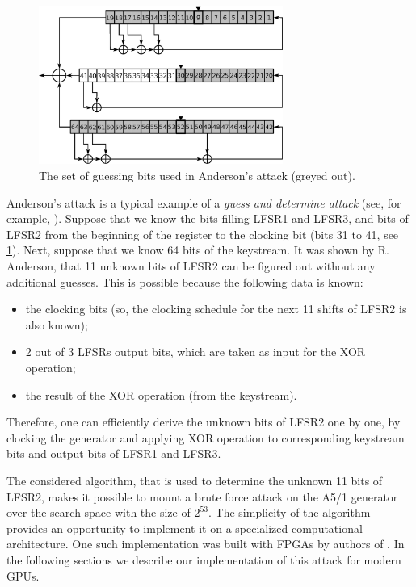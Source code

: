 \documentclass[runningheads,a4paper]{llncs}[2015/06/24]
\begin{document}
\begin{figure}
	\centering
	\includegraphics[width=8cm]{./a51and.eps} 
	\caption{The set of guessing bits used in Anderson's attack (greyed out).}
	\label{fig:a51and}
\end{figure}

Anderson's attack is a typical example of a \textit{guess and determine attack} (see, for example,
\cite{Bard:2009:AC:1618541}). Suppose that we know the bits filling LFSR1 and LFSR3, and
bits of LFSR2 from the beginning of the register to the clocking bit
(bits 31 to 41, see \cref{fig:a51and}). Next, suppose that we know 64 bits of the
keystream. It was shown by R. Anderson, that 11 unknown bits of LFSR2
can be figured out without any additional guesses. This is possible because the following data is known:

\begin{itemize}
\item the clocking bits (so, the clocking schedule for the next 11 shifts of LFSR2 is also known); 
\item 2 out of 3 LFSRs output bits, which are taken as input for the XOR operation; 
\item the result of the XOR operation (from the keystream). 
\end{itemize}

Therefore, one can efficiently derive the unknown bits of LFSR2 one by one, by clocking the
generator and applying XOR operation to corresponding keystream bits and output
bits of LFSR1 and LFSR3.

The considered algorithm, that is used to determine the unknown 11 bits of LFSR2,
makes it possible to mount a brute force attack on the A5/1 generator over the search space with the size of $2^{53}$. The simplicity of the algorithm provides an opportunity to implement it on a specialized
computational architecture. One such implementation was built with FPGAs by
authors of \cite{DBLP:conf/ches/GendrullisNR08}. In the following sections we describe our
implementation of this attack for modern GPUs.
\end{document}
